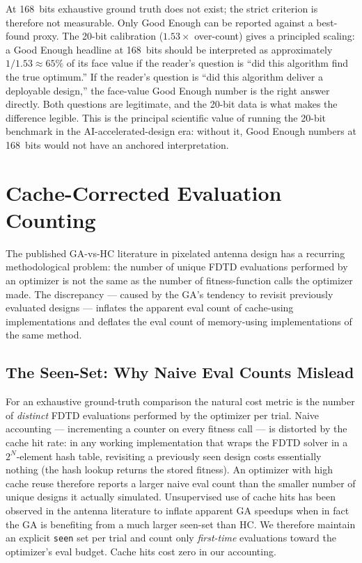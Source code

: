 At 168~bits exhaustive ground truth does not exist; the strict
criterion is therefore not measurable. Only Good Enough can be
reported against a best-found proxy. The 20-bit calibration
($1.53\times$ over-count) gives a principled scaling: a Good Enough
headline at 168~bits should be interpreted as approximately
$1/1.53 \approx 65\%$ of its face value if the reader's question
is ``did this algorithm find the true optimum.'' If the reader's
question is ``did this algorithm deliver a deployable design,'' the
face-value Good Enough number is the right answer directly. Both
questions are legitimate, and the 20-bit data is what makes the
difference legible. This is the principal scientific value of
running the 20-bit benchmark in the AI-accelerated-design era:
without it, Good Enough numbers at 168~bits would not have an
anchored interpretation.

\section{Cache-Corrected Evaluation Counting}
\label{app:cache}

The published GA-vs-HC literature in pixelated antenna design has a
recurring methodological problem: the number of unique FDTD
evaluations performed by an optimizer is not the same as the number
of fitness-function calls the optimizer made. The discrepancy ---
caused by the GA's tendency to revisit previously evaluated designs
--- inflates the apparent eval count of cache-using implementations
and deflates the eval count of memory-using implementations of the
same method.

\subsection{The Seen-Set: Why Naive Eval Counts Mislead}

For an exhaustive ground-truth comparison the natural cost metric
is the number of \emph{distinct} FDTD evaluations performed by the
optimizer per trial. Naive accounting --- incrementing a counter on
every fitness call --- is distorted by the cache hit rate: in any
working implementation that wraps the FDTD solver in a
$2^{N}$-element hash table, revisiting a previously seen design
costs essentially nothing (the hash lookup returns the stored
fitness). An optimizer with high cache reuse therefore reports a
larger naive eval count than the smaller number of unique designs
it actually simulated. Unsupervised use of cache hits has been
observed in the antenna literature to inflate apparent GA speedups
when in fact the GA is benefiting from a much larger seen-set than
HC. We therefore maintain an explicit \texttt{seen} set per trial
and count only \emph{first-time} evaluations toward the optimizer's
eval budget. Cache hits cost zero in our accounting.

